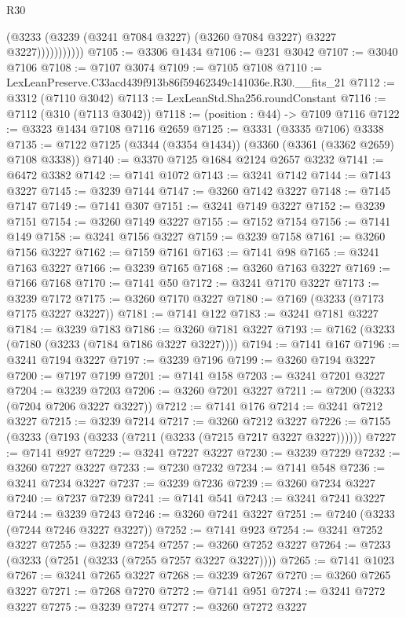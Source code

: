 \begin{lexlean}{R30}
\begin{coremodule}
                      (@3233 (@3239 (@3241 @7084 @3227) (@3260 @7084 @3227) @3227 @3227)))))))))))
@7105 := @3306 @1434
@7106 := @231 @3042
@7107 := @3040 @7106
@7108 := @7107 @3074
@7109 := @7105 @7108
@7110 := LexLeanPreserve.C33acd439f913b86f59462349c141036e.R30.__fits_21
@7112 := @3312 (@7110 @3042)
@7113 := LexLeanStd.Sha256.roundConstant
@7116 := @7112 (@310 (@7113 @3042))
@7118 := (position : @44) -> @7109 @7116
@7122 := @3323 @1434 @7108 @7116 @2659
@7125 := @3331 (@3335 @7106) @3338
@7135 := @7122 @7125 (@3344 (@3354 @1434)) (@3360 (@3361 (@3362 @2659) @7108 @3338))
@7140 := @3370 @7125 @1684 @2124 @2657 @3232
@7141 := @6472 @3382
@7142 := @7141 @1072
@7143 := @3241 @7142
@7144 := @7143 @3227
@7145 := @3239 @7144
@7147 := @3260 @7142 @3227
@7148 := @7145 @7147
@7149 := @7141 @307
@7151 := @3241 @7149 @3227
@7152 := @3239 @7151
@7154 := @3260 @7149 @3227
@7155 := @7152 @7154
@7156 := @7141 @149
@7158 := @3241 @7156 @3227
@7159 := @3239 @7158
@7161 := @3260 @7156 @3227
@7162 := @7159 @7161
@7163 := @7141 @98
@7165 := @3241 @7163 @3227
@7166 := @3239 @7165
@7168 := @3260 @7163 @3227
@7169 := @7166 @7168
@7170 := @7141 @50
@7172 := @3241 @7170 @3227
@7173 := @3239 @7172
@7175 := @3260 @7170 @3227
@7180 := @7169 (@3233 (@7173 @7175 @3227 @3227))
@7181 := @7141 @122
@7183 := @3241 @7181 @3227
@7184 := @3239 @7183
@7186 := @3260 @7181 @3227
@7193 := @7162 (@3233 (@7180 (@3233 (@7184 @7186 @3227 @3227))))
@7194 := @7141 @167
@7196 := @3241 @7194 @3227
@7197 := @3239 @7196
@7199 := @3260 @7194 @3227
@7200 := @7197 @7199
@7201 := @7141 @158
@7203 := @3241 @7201 @3227
@7204 := @3239 @7203
@7206 := @3260 @7201 @3227
@7211 := @7200 (@3233 (@7204 @7206 @3227 @3227))
@7212 := @7141 @176
@7214 := @3241 @7212 @3227
@7215 := @3239 @7214
@7217 := @3260 @7212 @3227
@7226 := @7155 (@3233 (@7193 (@3233 (@7211 (@3233 (@7215 @7217 @3227 @3227))))))
@7227 := @7141 @927
@7229 := @3241 @7227 @3227
@7230 := @3239 @7229
@7232 := @3260 @7227 @3227
@7233 := @7230 @7232
@7234 := @7141 @548
@7236 := @3241 @7234 @3227
@7237 := @3239 @7236
@7239 := @3260 @7234 @3227
@7240 := @7237 @7239
@7241 := @7141 @541
@7243 := @3241 @7241 @3227
@7244 := @3239 @7243
@7246 := @3260 @7241 @3227
@7251 := @7240 (@3233 (@7244 @7246 @3227 @3227))
@7252 := @7141 @923
@7254 := @3241 @7252 @3227
@7255 := @3239 @7254
@7257 := @3260 @7252 @3227
@7264 := @7233 (@3233 (@7251 (@3233 (@7255 @7257 @3227 @3227))))
@7265 := @7141 @1023
@7267 := @3241 @7265 @3227
@7268 := @3239 @7267
@7270 := @3260 @7265 @3227
@7271 := @7268 @7270
@7272 := @7141 @951
@7274 := @3241 @7272 @3227
@7275 := @3239 @7274
@7277 := @3260 @7272 @3227

\end{coremodule}
\end{lexlean}

